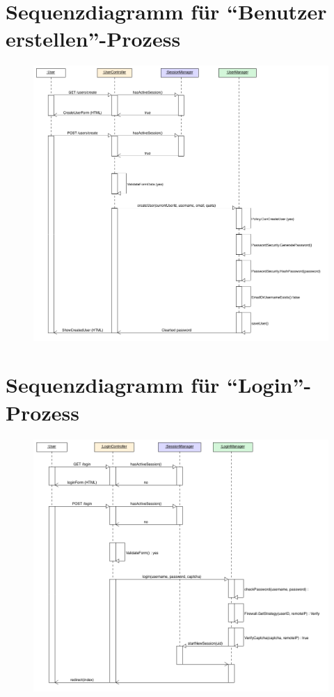 \documentclass[12pt,DIV14,BCOR10mm,a4paper,parskip=half-,headsepline,headinclude,english,ngerman,bibliography=totocnumbered]{scrreprt}
\begin{document}
\begin{appendices}
\chapter{Sequenzdiagramm für \enquote{Benutzer erstellen}-Prozess}
\begin{figure}[!htb]
	\hspace*{-1cm}
	\includegraphics[width=0.83\paperwidth]{resources/createuserseq_diagram.png}
	\label{architecture:createuserseq_diagram}
\end{figure}

\chapter{Sequenzdiagramm für \enquote{Login}-Prozess}
\begin{figure}[!htb]
	\hspace*{-1cm}
	\includegraphics[width=0.83\paperwidth]{resources/loginseq_diagram.png}
	\label{architecture:loginseq_diagram}
\end{figure}

\end{appendices}
\end{document}

